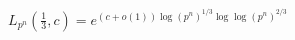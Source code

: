 \documentclass[preview]{standalone}
\begin{document}
\begin{align*}
L_{p^n}\left(\frac{1}{3}, c\right) = e^{ (c+o(1)) \log(p^n)^{1/3} \log\log(p^n)^{2/3} }
\end{align*}
\end{document}
